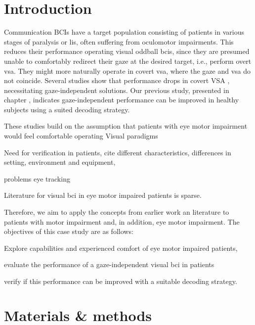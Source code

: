 \section{Introduction}

Communication BCIs have a target population consisting of patients in various
stages of paralysis or \ac{lis}, often suffering from oculomotor impairments.
This reduces their performance operating visual oddball \ac{bci}s, since they
are presumed unable to comfortably redirect their gaze at the desired target,
i.e., perform overt \ac{vsa}.
They might more naturally operate in covert \ac{vsa}, where the gaze and
\ac{vsa} do not coincide.
Several studies show that performance drops in covert VSA , necessitating gaze-independent solutions.
Our previous study, presented in chapter , indicates gaze-independent performance can be
improved in healthy subjects using a suited decoding strategy.

These studies build on the assumption that patients with eye motor impairment
would feel comfortable operating
Visual paradigms

Need for verification in patients, cite different characteristics, differences
in setting, environment and equipment,


problems eye tracking

Literature for visual \ac{bci} in eye motor impaired patients is sparse.

Therefore, we aim to apply the concepts from earlier work an literature to
patients with motor impairment and, in addition, eye motor impairment.
The objectives of this case study are as follows:
\begin{enumerate*}
  \item Explore capabilities and experienced comfort of eye motor impaired
    patients,
  \item evaluate the performance of a gaze-independent visual \ac{bci} in patients
  \item verify if this performance can be improved with a suitable decoding
    strategy.
\end{enumerate*}


\section{Materials \& methods}

